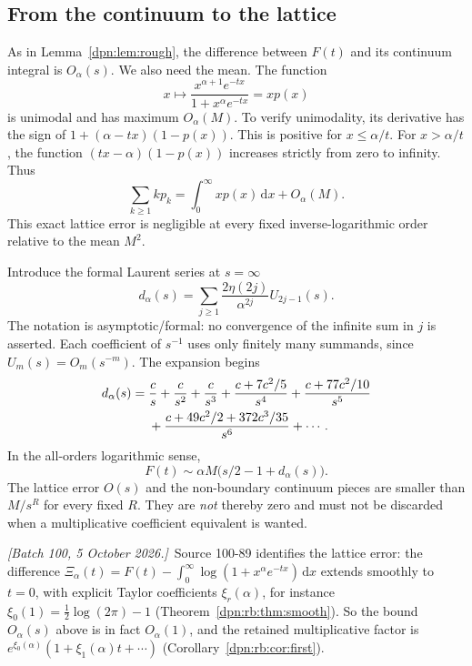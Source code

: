 \documentclass[11pt]{article}
\numberwithin{equation}{section}
\theoremstyle{definition}\newtheorem{definition}[theorem]{Definition}
\theoremstyle{remark}\newtheorem{remark}[theorem]{Remark}
\newcommand{\dd}{\,\mathrm d}\newcommand{\ii}{\mathrm i}
\newcommand{\writenoted}[1]{\par\smallskip\noindent\textit{[Batch 100, 5 October 2026.]}\ #1\par\smallskip}
\begin{document}
\subsection{From the continuum to the lattice}
As in Lemma~\ref{dpn:lem:rough}, the difference between $F(t)$ and its continuum
integral is $O_\alpha(s)$. We also need the mean. The function
\[
 x\longmapsto \frac{x^{\alpha+1}e^{-tx}}{1+x^\alpha e^{-tx}}=xp(x)
\]
is unimodal and has maximum $O_\alpha(M)$. To verify unimodality, its derivative
has the sign of $1+(\alpha-tx)(1-p(x))$. This is positive for
$x\le\alpha/t$. For $x>\alpha/t$, the function
$(tx-\alpha)(1-p(x))$ increases strictly from zero to infinity. Thus
\begin{equation}\label{dpn:eq:meanlattice}
 \sum_{k\ge1}kp_k=\int_0^\infty xp(x)\dd x+O_\alpha(M).
\end{equation}
This exact lattice error is negligible at every fixed inverse-logarithmic
order relative to the mean $M^2$.

Introduce the formal Laurent series at $s=\infty$
\begin{equation}\label{dpn:eq:dformal}
 d_\alpha(s)=\sum_{j\ge1}
       \frac{2\eta(2j)}{\alpha^{2j}}U_{2j-1}(s).
\end{equation}
The notation is asymptotic/formal: no convergence of the infinite sum in $j$
is asserted. Each coefficient of $s^{-1}$ uses only finitely many summands,
since $U_m(s)=O_m(s^{-m})$. The expansion begins
\begin{align}\label{dpn:eq:dseries}
 d_\alpha(s)={}&\frac c s+\frac c{s^2}+\frac c{s^3}
 +\frac{c+7c^2/5}{s^4}
 +\frac{c+77c^2/10}{s^5}\notag\\
 &+\frac{c+49c^2/2+372c^3/35}{s^6}+\cdots.
\end{align}
In the all-orders logarithmic sense,
\begin{equation}\label{dpn:eq:Fformal}
 F(t)\sim\alpha M\bigl(s/2-1+d_\alpha(s)\bigr).
\end{equation}
The lattice error $O(s)$ and the non-boundary continuum pieces are smaller
than $M/s^R$ for every fixed $R$. They are \emph{not} thereby zero and must
not be discarded when a multiplicative coefficient equivalent is wanted.
\writenoted{Source 100-89 identifies the lattice error: the difference
$\Xi_\alpha(t)=F(t)-\int_0^\infty\log(1+x^\alpha e^{-tx})\dd x$ extends smoothly to
$t=0$, with explicit Taylor coefficients $\xi_r(\alpha)$, for instance
$\xi_0(1)=\frac12\log(2\pi)-1$ (Theorem~\ref{dpn:rb:thm:smooth}).  So the
bound $O_\alpha(s)$ above is in fact $O_\alpha(1)$, and the retained
multiplicative factor is $e^{\xi_0(\alpha)}(1+\xi_1(\alpha)t+\cdots)$
(Corollary~\ref{dpn:rb:cor:first}).}
\end{document}
